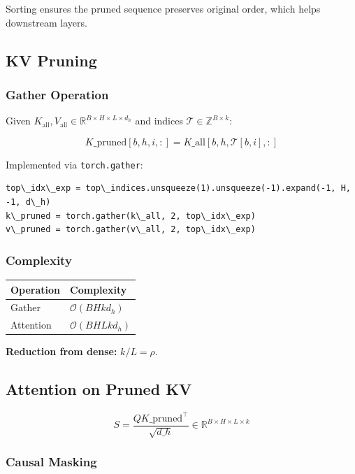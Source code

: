 Sorting ensures the pruned sequence preserves original order, which helps 
downstream layers.

\subsection{KV Pruning}

\subsubsection{Gather Operation}

Given $K_\text{all}, V_\text{all} \in \mathbb{R}^{B \times H \times L \times d_h}$ 
and indices $\mathcal{T} \in \mathbb{Z}^{B \times k}$:

\[
K\_\text{pruned}[b, h, i, :] = K\_\text{all}[b, h, \mathcal{T}[b, i], :]
\tag{4.3}
\]

Implemented via \texttt{torch.gather}:

\begin{lstlisting}
top\_idx\_exp = top\_indices.unsqueeze(1).unsqueeze(-1).expand(-1, H, -1, d\_h)
k\_pruned = torch.gather(k\_all, 2, top\_idx\_exp)
v\_pruned = torch.gather(v\_all, 2, top\_idx\_exp)
\end{lstlisting}

\subsubsection{Complexity}

\begin{table}[H]
\centering
\small
\begin{tabular}{ll}
\toprule
\textbf{Operation} & \textbf{Complexity} \\
\midrule
Gather & $\mathcal{O}(B H k d_h)$ \\
Attention & $\mathcal{O}(B H L k d_h)$ \\
\bottomrule
\end{tabular}
\end{table}

\textbf{Reduction from dense:} $k / L = \rho$.

\subsection{Attention on Pruned KV}

\[
S = \frac{Q K\_\text{pruned}^\top}{\sqrt{d\_h}} \in \mathbb{R}^{B \times H \times L \times k}
\tag{4.4}
\]

\subsubsection{Causal Masking}

